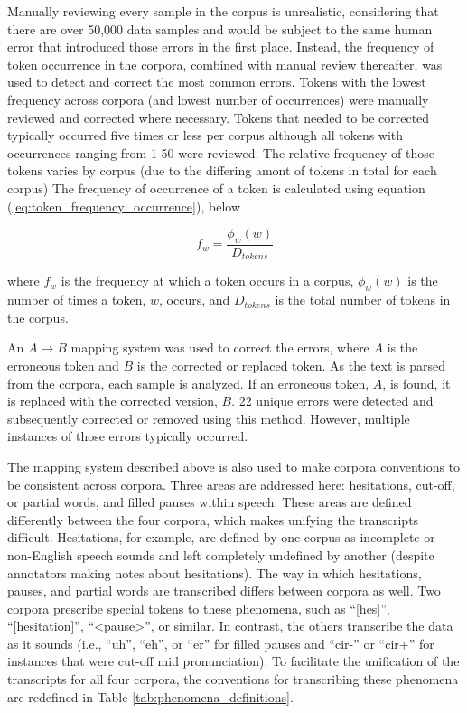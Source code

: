 \documentclass[12pt]{article}
\begin{document}
Manually reviewing every sample in the corpus is unrealistic, considering that there are over 50,000 data samples and would be subject to the same
human error that introduced those errors in the first place. Instead, the frequency of token occurrence in the corpora, combined with manual review
thereafter, was used to detect and correct the most common errors. Tokens with the lowest frequency across corpora (and lowest number of occurrences)
were manually reviewed and corrected where necessary. Tokens that needed to be corrected typically occurred five times or less per corpus although
all tokens with occurrences ranging from 1-50 were reviewed. The relative frequency of those tokens varies by corpus (due to the differing amont of
tokens in total for each corpus) The frequency of occurrence of a token is calculated using equation (\ref{eq:token_frequency_occurrence}), below

\begin{equation}\label{eq:token_frequency_occurrence}
    f_w = \frac{\phi_w(w)}{D_{tokens}}
\end{equation}

\noindent
where $f_w$ is the frequency at which a token occurs in a corpus, $\phi_w(w)$ is the number of times a token, $w$, occurs, and $D_{tokens}$ is the
total number of tokens in the corpus.

An $A \rightarrow B$ mapping system was used to correct the errors, where \(A\) is the erroneous token and \(B\) is the
corrected or replaced token. As the text is parsed from the corpora, each sample is analyzed. If an erroneous token, $A$, is found, it is replaced
with the corrected version, $B$. 22 unique errors were detected and subsequently corrected or removed using this method. However, multiple instances
of those errors typically occurred.

The mapping system described above is also used to make corpora conventions to be consistent across corpora. Three areas are addressed here:
hesitations, cut-off, or partial words, and filled pauses within speech. These areas are defined differently between the four corpora, which makes
unifying the transcripts difficult. Hesitations, for example, are defined by one corpus as incomplete or non-English speech sounds and left completely
undefined by another (despite annotators making notes about hesitations). The way in which hesitations, pauses, and partial words are transcribed
differs between corpora as well. Two corpora prescribe special tokens to these phenomena, such as ``[hes]'', ``[hesitation]'', ``<pause>'', or
similar. In contrast, the others transcribe the data as it sounds (i.e., ``uh'', ``eh'', or ``er'' for filled pauses and ``cir-'' or ``cir+'' for
instances that were cut-off mid pronunciation). To facilitate the unification of the transcripts for all four corpora, the conventions for
transcribing these phenomena are redefined in Table \ref{tab:phenomena_definitions}.
\end{document}
